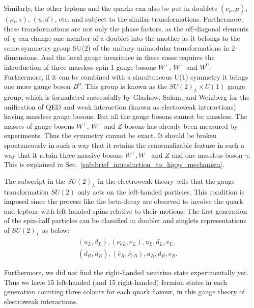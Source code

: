 


Similarly, the other leptons and the quarks can also be put in doublets $(\nu_\mu, \mu)$, $(\nu_\tau,\tau)$, $(u,d)$, etc. and subject to the similar transformations.
Furthermore, these transformations are not only the phase factors, as the off-diagonal elements of $\chi$ can change one member of a doublet into the another as it belongs to the same symmetry group SU(2) of the unitary unimodular transformations in 2-dimensions.
And the local gauge invariance in these cases requires the introduction of three massless spin-1 gauge bosons $W^+,~W^-$ and $W^0$.
Furthermore, if it can be combined with a simultaneous U(1) symmetry it brings one more gauge boson $B^0$. This group is known as the $SU(2)_L\times U(1)$ gauge group, which is formulated successfully by Glashow, Salam, and Weinberg for the unification of QED and weak interaction (known as electroweak interactions)~\cite{StandardModel67_2} having massless gauge bosons. But all the gauge bosons cannot be massless. The masses of gauge bosons $W^+$, $W^-$ and $Z$ bosons has already been measured by experiments. Thus the symmetry cannot be exact. It should be broken spontaneously in such a way that it retains the renormalizable feature in such a way that it retain three massive bosons $W^+, W^-$ and $Z$ and one massless boson $\gamma$. This is explained in Sec.~\ref{sub:brief_introduction_to_higgs_mechanism}.

The subscript in the $SU(2)_L$ in the electroweak theory tells that the gauge transformation $SU(2)$ only acts on the left-handed particles. This condition is imposed since the process like the beta-decay are observed to involve the quark and leptons with left-handed spins relative to their motions. The first generation of the spin-half particles can be classified in doublet and singlets representations of $SU(2)_L$ as below:
\begin{eqnarray}
    (u_L,d_L),(\nu_{eL},e_L),\bar{u}_L,\bar{d}_L,\bar{e}_L, \nonumber \\
    (\bar{d}_R,\bar{u}_R),(\bar{e}_R,\bar{\nu}_{eR}),u_R,d_R,e_R.   \nonumber
\end{eqnarray}

Furthermore, we did not find the right-handed neutrino state experimentally yet.
Thus we have 15 left-handed (and 15 right-handed) fermion states in each generation counting three colours for each quark flavour, in this gauge theory of electroweak interactions.

